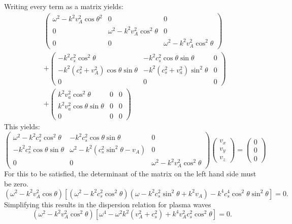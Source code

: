 \documentclass{article}
\begin{document}
Writing every term as a matrix yields:
\begin{align*}
	&\begin{pmatrix}
		\omega^2  - k^2 v_A^2 \cos\theta^2    & 0 & 0 \\
		0 & \omega^2 - k^2v_A^2\cos^2\theta & 0 \\
		0 & 0 & \omega^2 - k^2v_A^2\cos^2\theta
	\end{pmatrix} \\
	 & + \begin{pmatrix} 
		 -k^2 c_s^2 \cos^2 \theta & - k^2 c_s^2 \cos\theta \sin \theta  & 0 \\
		 -k^2(c_s^2 + v_A^2) \cos\theta \sin \theta & -k^2(c_s^2 + v_a^2) \sin^2\theta & 0 \\
		 0 & 0 & 0
	 \end{pmatrix} \\  
	 &  + \begin{pmatrix} 
		 k^2 v_a^2 \cos^2\theta & 0 & 0  \\
		 k^2 v_a^2 \cos \theta \sin \theta & 0 & 0 \\
		 0 & 0 & 0
	 \end{pmatrix} 
\end{align*}
This yields:
\begin{equation}\label{eq:MHD_linear_matrix}
	\begin{pmatrix}
		\omega^2  - k^2 c_s^2 \cos^2\theta   & -k^2c_s^2\cos\theta \sin \theta & 0 \\
		-k^2 c_s^2 \cos\theta \sin \theta & \omega^2 - k^2(c_s^2\sin^2\theta - v_A)   & 0 \\
		0 & 0 & \omega^2 - k^2v_A^2\cos^2\theta
	\end{pmatrix} 
	\begin{pmatrix} v_x \\ v_y \\ v_z \end{pmatrix} 
	 = \begin{pmatrix} 0 \\ 0 \\0  \end{pmatrix} 
\end{equation}
For this to be satisfied, the determinant of the matrix on the left hand side must be zero. 
\[
	(\omega^2 - k^2v_A^2 \cos \theta)\left[ (\omega^2-k^2c_s^2 \cos^2 \theta)(\omega - k^2c_s^2 \sin^2 \theta + k^2 v_A) - k^4c_s^{4}\cos^2\theta \sin^2\theta   \right] = 0
.\] 
Simplifying this results in the dispersion relation for plasma waves
\begin{equation}\label{eq:disperion}
	(\omega^2 - k^2 v_A^2 \cos^2 \theta)\left[ \omega^{4} - \omega^2k^2(v_A^2 + c_s^2) + k^{4}v_A^2c_s^2\cos^2\theta \right]  = 0
.\end{equation} 
\end{document}
